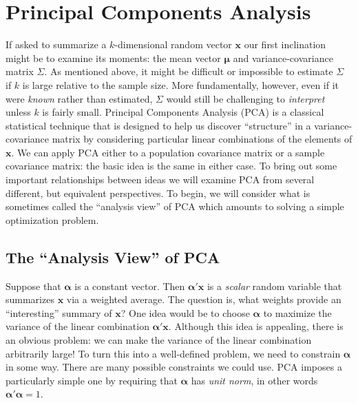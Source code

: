 \documentclass[12pt]{article}
\theoremstyle{definition}
\begin{document}
\section{Principal Components Analysis}
If asked to summarize a $k$-dimensional random vector $\mathbf{x}$ our first inclination might be to examine its moments: the mean vector $\boldsymbol{\mu}$ and variance-covariance matrix $\Sigma$. As mentioned above, it might be difficult or impossible to estimate $\Sigma$ if $k$ is large relative to the sample size. More fundamentally, however, even if it were \emph{known} rather than estimated, $\Sigma$ would still be challenging to \emph{interpret} unless $k$ is fairly small. Principal Components Analysis (PCA) is a classical statistical technique that is designed to help us discover ``structure'' in a variance-covariance matrix by considering particular linear combinations of the elements of $\mathbf{x}$. We can apply PCA either to a population covariance matrix or a sample covariance matrix: the basic idea is the same in either case. To bring out some important relationships between ideas we will examine PCA from several different, but equivalent perspectives. To begin, we will consider what is sometimes called the ``analysis view'' of PCA which amounts to solving a simple optimization problem. 

\subsection{The ``Analysis View'' of PCA}
Suppose that $\boldsymbol{\alpha}$ is a constant vector. Then $\boldsymbol{\alpha}'\mathbf{x}$ is a \emph{scalar} random variable that summarizes $\mathbf{x}$ via a weighted average. The question is, what weights provide an ``interesting'' summary of $\mathbf{x}$? One idea would be to choose $\boldsymbol{\alpha}$ to maximize the variance of the linear combination $\boldsymbol{\alpha}'\mathbf{x}$. Although this idea is appealing, there is an obvious problem: we can make the variance of the linear combination arbitrarily large! To turn this into a well-defined problem, we need to constrain $\boldsymbol{\alpha}$ in some way. There are many possible constraints we could use. PCA imposes a particularly simple one by requiring that $\boldsymbol{\alpha}$ has \emph{unit norm}, in other words $\boldsymbol{\alpha}'\boldsymbol{\alpha} = 1$. 
\end{document}
